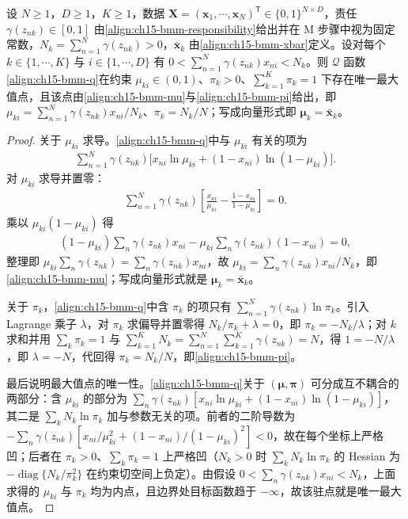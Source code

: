\documentclass[../../main.tex]{subfiles}
\begin{document}
\begin{proposition}\label{proposition:ch15-Bernoulli混合EM}
设 $N\geqslant1$，$D\geqslant1$，$K\geqslant1$，数据 $\bm{X}=(\bm{x}_1,\cdots,\bm{x}_N)^{\mathsf T}\in\{0,1\}^{N\times D}$，责任 $\gamma(z_{nk})\in[0,1]$ 由\eqref{align:ch15-bmm-responsibility}给出并在 M 步骤中视为固定常数，$N_k=\sum_{n=1}^{N}\gamma(z_{nk})>0$，$\bar{\bm{x}}_k$ 由\eqref{align:ch15-bmm-xbar}定义。设对每个 $k\in\{1,\cdots,K\}$ 与 $i\in\{1,\cdots,D\}$ 有 $0<\sum_{n=1}^{N}\gamma(z_{nk})x_{ni}<N_k$。则 $\mathcal{Q}$ 函数\eqref{align:ch15-bmm-q}在约束 $\mu_{ki}\in(0,1)$、$\pi_k>0$、$\sum_{k=1}^{K}\pi_k=1$ 下存在唯一最大值点，且该点由\eqref{align:ch15-bmm-mu}与\eqref{align:ch15-bmm-pi}给出，即 $\mu_{ki}=\sum_{n=1}^{N}\gamma(z_{nk})x_{ni}/N_k$、$\pi_k=N_k/N$；写成向量形式即 $\bm{\mu}_k=\bar{\bm{x}}_k$。
\end{proposition}
\begin{proof}
关于 $\mu_{ki}$ 求导。\eqref{align:ch15-bmm-q}中与 $\mu_{ki}$ 有关的项为
\begin{align*}
\sum_{n=1}^{N}\gamma(z_{nk})\big[x_{ni}\ln\mu_{ki}+(1-x_{ni})\ln(1-\mu_{ki})\big].
\end{align*}
对 $\mu_{ki}$ 求导并置零：
\begin{align*}
\sum_{n=1}^{N}\gamma(z_{nk})\left[\frac{x_{ni}}{\mu_{ki}}-\frac{1-x_{ni}}{1-\mu_{ki}}\right]=0.
\end{align*}
乘以 $\mu_{ki}(1-\mu_{ki})$ 得
\begin{align*}
(1-\mu_{ki})\sum_{n}\gamma(z_{nk})x_{ni}-\mu_{ki}\sum_{n}\gamma(z_{nk})(1-x_{ni})=0,
\end{align*}
整理即 $\mu_{ki}\sum_n\gamma(z_{nk})=\sum_n\gamma(z_{nk})x_{ni}$，故 $\mu_{ki}=\sum_n\gamma(z_{nk})x_{ni}/N_k$，即\eqref{align:ch15-bmm-mu}；写成向量形式就是 $\bm{\mu}_k=\bar{\bm{x}}_k$。

关于 $\pi_k$，\eqref{align:ch15-bmm-q}中含 $\pi_k$ 的项只有 $\sum_{n=1}^{N}\gamma(z_{nk})\ln\pi_k$。引入 Lagrange 乘子 $\lambda$，对 $\pi_k$ 求偏导并置零得 $N_k/\pi_k+\lambda=0$，即 $\pi_k=-N_k/\lambda$；对 $k$ 求和并用 $\sum_k\pi_k=1$ 与 $\sum_{k=1}^{K}N_k=\sum_{n=1}^{N}\sum_{k=1}^{K}\gamma(z_{nk})=N$，得 $1=-N/\lambda$，即 $\lambda=-N$，代回得 $\pi_k=N_k/N$，即\eqref{align:ch15-bmm-pi}。

最后说明最大值点的唯一性。\eqref{align:ch15-bmm-q}关于 $(\bm{\mu},\bm{\pi})$ 可分成互不耦合的两部分：含 $\mu_{ki}$ 的部分为 $\sum_{n}\gamma(z_{nk})[x_{ni}\ln\mu_{ki}+(1-x_{ni})\ln(1-\mu_{ki})]$，其二是 $\sum_{k}N_k\ln\pi_k$ 加与参数无关的项。前者的二阶导数为 $-\sum_n\gamma(z_{nk})[x_{ni}/\mu_{ki}^{2}+(1-x_{ni})/(1-\mu_{ki})^{2}]<0$，故在每个坐标上严格凹；后者在 $\pi_k>0$、$\sum_k\pi_k=1$ 上严格凹（$N_k>0$ 时 $\sum_kN_k\ln\pi_k$ 的 Hessian 为 $-\operatorname{diag}\{N_k/\pi_k^{2}\}$ 在约束切空间上负定）。由假设 $0<\sum_n\gamma(z_{nk})x_{ni}<N_k$，上面求得的 $\mu_{ki}$ 与 $\pi_k$ 均为内点，且边界处目标函数趋于 $-\infty$，故该驻点就是唯一最大值点。
\end{proof}
\end{document}
